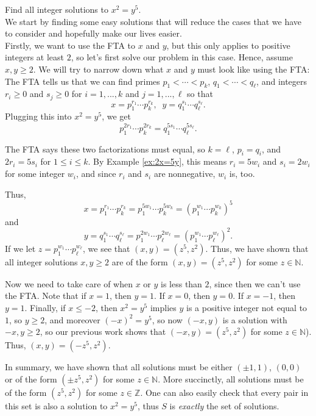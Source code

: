 \documentclass[11pt,dvipsnames]{book}
\numberwithin{equation}{section} %
\numberwithin{figure}{section} %
\numberwithin{table}{section} %
\begin{document}
\begin{example}
Find all integer solutions to $x^{2}=y^{5}$. \\

We start by finding some easy solutions that will reduce the cases that we have to consider and hopefully make our lives easier. \\

Firstly, we want to use the FTA to $x$ and $y$, but this only applies to positive integers at least $2$, so let's first solve our problem in this case. Hence, assume $x,y\geq 2$. We will try to narrow down what $x$ and $y$ must look like using the FTA: The FTA tells us that we can find primes $p_{1}<\cdots <p_{k}$, $q_{1}<\cdots <q_{\ell}$, and integers $r_{i}\geq 0$ and $s_{j}\geq 0$ for $i=1,...,k$ and $j=1,...,\ell$ so that 
\[
x=p_{1}^{r_{1}}\cdots p_{k}^{r_{k}},\;\; y= q_1^{s_{1}}\cdots q_\ell^{s_{\ell}}.
\]
Plugging this into $x^2=y^5$, we get 
\[
p_{1}^{2r_{1}}\cdots p_{k}^{2r_{k}} = q_1^{5s_{1}}\cdots q_\ell^{5s_{\ell}}.
\]

The FTA says these two factorizations must equal, so $k=\ell$, $p_i=q_i$, and $2r_{i}=5s_{i}$ for $1\leq i\leq k$. By Example \ref{ex:2x=5y}, this means $r_{i}=5w_{i}$ and $s_{i}=2w_{i}$ for some integer $w_{i}$, and since $r_{i}$ and $s_{i}$ are nonnegative, $w_{i}$ is, too. 

Thus,
\[
x=p_{1}^{r_{1}}\cdots p_{k}^{r_{k}}=p_{1}^{5w_{1}}\cdots p_{k}^{5w_{k}}= \left(p_{1}^{w_{1}}\cdots p_{k}^{w_{k}}\right)^{5}
\]
and 
\[
y=
q_1^{s_{1}}\cdots q_\ell^{s_{\ell}}
=p_1^{2w_{1}}\cdots p_\ell^{2w_{\ell}} = \left(p_1^{w_{1}}\cdots p_\ell^{w_{\ell}}\right)^2.
\]
If we let $z=p_1^{w_{1}}\cdots p_\ell^{w_{\ell}}$, we see that $(x,y)=(z^{5},z^{2})$. Thus, we have shown that all integer solutions $x,y\geq 2$ are of the form $(x,y)=(z^{5},z^{2})$ for some $z\in\mathbb{N}$.

Now we need to take care of when $x$ or $y$ is less than $2$, since then we can't use the FTA. Note that if $x=1$, then $y=1$. If $x=0$, then $y=0$. If $x=-1$, then $y=1$. Finally, if $x\leq -2$, then $x^2=y^5$ implies $y$ is a positive integer not equal to $1$, so $y\geq 2$, and moreover $(-x)^2=y^5$, so now $(-x,y)$ is a solution with $-x,y\geq 2$, so our previous work shows that $(-x,y)=(z^5,z^2)$ for some $z\in\mathbb{N}$). Thus, $(x,y)=(-z^5,z^2)$. 

In summary, we have shown that all solutions must be either $(\pm 1, 1)$, $(0,0)$ or of the form $(\pm z^5,z^2)$ for some $z\in\mathbb{N}$. More succinctly, all solutions must be of the form $( z^5,z^2)$ for some $z\in\mathbb{Z}$. One can also easily check that every pair in this set is also a solution to $x^2=y^5$, thus $S$ is {\it exactly} the set of solutions. 

\end{example}
\end{document}
